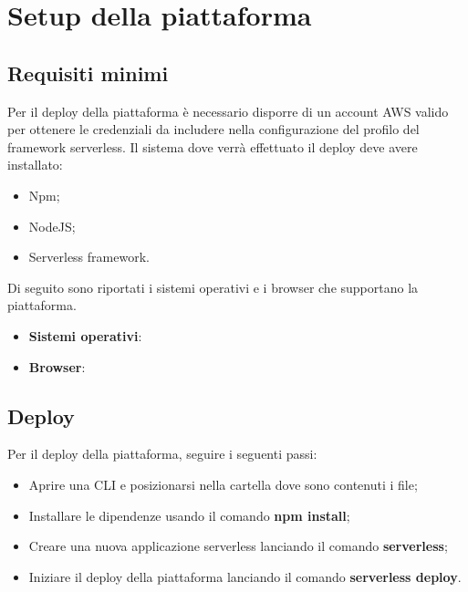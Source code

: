 \section{Setup della piattaforma}
\subsection{Requisiti minimi}
Per il deploy della piattaforma \NomeProgetto è necessario disporre di un account AWS valido per ottenere le credenziali da includere nella configurazione del profilo del framework serverless.
Il sistema dove verrà effettuato il deploy deve avere installato:
\begin{itemize}
	\item Npm;
	\item NodeJS;
	\item Serverless framework.
\end{itemize}
Di seguito sono riportati i sistemi operativi e i browser che supportano la piattaforma.
\begin{itemize}
	\item \textbf{Sistemi operativi}:
	\item \textbf{Browser}:
\end{itemize}

\subsection{Deploy}
Per il deploy della piattaforma, seguire i seguenti passi:
\begin{itemize}
	\item Aprire una CLI e posizionarsi nella cartella dove sono contenuti i file;
	\item Installare le dipendenze usando il comando \textbf{npm install};
	\item Creare una nuova applicazione serverless lanciando il comando \textbf{serverless};
	\item Iniziare il deploy della piattaforma \NomeProgetto lanciando il comando \textbf{serverless deploy}.
	
\end{itemize}